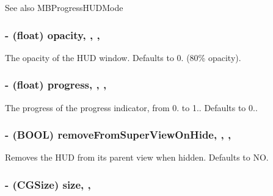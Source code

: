 \begin{DoxySeeAlso}{See also}
M\+B\+Progress\+H\+U\+D\+Mode 
\end{DoxySeeAlso}
\hypertarget{interface_m_b_progress_h_u_d_a24ab5e37917e3489d6add081324a49ff}{
\subsubsection[{opacity}]{\setlength{\rightskip}{0pt plus 5cm}-\/ (float) opacity\hspace{0.3cm}{\ttfamily [read]}, {\ttfamily [write]}, {\ttfamily [atomic]}, {\ttfamily [assign]}}}\label{interface_m_b_progress_h_u_d_a24ab5e37917e3489d6add081324a49ff}
The opacity of the H\+U\+D window. Defaults to 0. (80\% opacity). \hypertarget{interface_m_b_progress_h_u_d_a4c8328617d11efd1f5452032246ca97f}{
\subsubsection[{progress}]{\setlength{\rightskip}{0pt plus 5cm}-\/ (float) progress\hspace{0.3cm}{\ttfamily [read]}, {\ttfamily [write]}, {\ttfamily [atomic]}, {\ttfamily [assign]}}}\label{interface_m_b_progress_h_u_d_a4c8328617d11efd1f5452032246ca97f}
The progress of the progress indicator, from 0. to 1.. Defaults to 0.. \hypertarget{interface_m_b_progress_h_u_d_a36639aa18a70f2734942695c32ec5e91}{
\subsubsection[{remove\+From\+Super\+View\+On\+Hide}]{\setlength{\rightskip}{0pt plus 5cm}-\/ (B\+O\+O\+L) remove\+From\+Super\+View\+On\+Hide\hspace{0.3cm}{\ttfamily [read]}, {\ttfamily [write]}, {\ttfamily [atomic]}, {\ttfamily [assign]}}}\label{interface_m_b_progress_h_u_d_a36639aa18a70f2734942695c32ec5e91}
Removes the H\+U\+D from its parent view when hidden. Defaults to N\+O. \hypertarget{interface_m_b_progress_h_u_d_a0c987a2e4026910e21167e95fee7b4e4}{
\subsubsection[{size}]{\setlength{\rightskip}{0pt plus 5cm}-\/ (C\+G\+Size) size\hspace{0.3cm}{\ttfamily [read]}, {\ttfamily [atomic]}, {\ttfamily [assign]}}}\label{interface_m_b_progress_h_u_d_a0c987a2e4026910e21167e95fee7b4e4}
